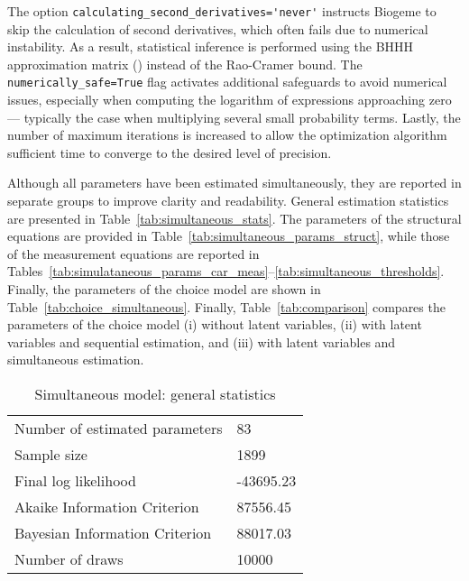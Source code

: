 \documentclass[12pt,a4paper]{article}
\begin{document}
The option \lstinline$calculating_second_derivatives='never'$
instructs Biogeme to skip the calculation of second derivatives, which
often fails due to numerical instability. As a result, statistical
inference is performed using the BHHH approximation
matrix (\cite{BernHallHallHaus74}) instead of the Rao-Cramer bound. The
\lstinline$numerically_safe=True$ flag activates additional safeguards
to avoid numerical issues, especially when computing the logarithm of
expressions approaching zero --- typically the case when multiplying
several small probability terms. Lastly, the number of maximum
iterations is increased to allow the optimization algorithm sufficient
time to converge to the desired level of precision.

Although all parameters have been estimated simultaneously, they are
reported in separate groups to improve clarity and
readability. General estimation statistics are presented in
Table~\vref{tab:simultaneous_stats}. The parameters of the structural
equations are provided in Table~\vref{tab:simultaneous_params_struct},
while those of the measurement equations are reported in
Tables~\ref{tab:simulataneous_params_car_meas}--\ref{tab:simultaneous_thresholds}. Finally,
the parameters of the choice model are shown in
Table~\vref{tab:choice_simultaneous}. Finally, Table~\vref{tab:comparison} compares the parameters of the choice model (i) without latent variables, (ii) with latent variables and sequential estimation, and (iii) with latent variables and simultaneous estimation.



\begin{table}[htb]
  \begin{center}
    \footnotesize
    \begin{tabular}{ll}
Number of estimated parameters & 83 \\
Sample size & 1899 \\
Final log likelihood & -43695.23 \\
Akaike Information Criterion & 87556.45 \\
Bayesian Information Criterion & 88017.03 \\      
Number of draws & 10000 \\
\end{tabular}
  \caption{ \label{tab:simultaneous_stats}Simultaneous model: general statistics}
  \end{center}

\end{table}
\end{document}
